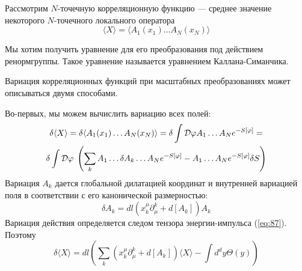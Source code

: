 \documentclass[a4paper,12pt]{article}
\theoremstyle{definition}
\theoremstyle{definition}
\theoremstyle{definition}
\begin{document}
Рассмотрим $N$-точечную корреляционную функцию --- среднее значение некоторого $N$-точечного локального оператора
\begin{equation}
  \label{eq:81}
  \langle X\rangle =\langle A_1 (x_1)\dots A_N (x_N)\rangle
\end{equation}

Мы хотим получить уравнение для его преобразования под действием ренормгруппы. Такое уравнение называется уравнением Каллана-Симанчика. 

Вариация корреляционных функций при масштабных преобразованиях может описываться двумя способами.

Во-первых, мы можем вычислить вариацию всех полей:
\begin{multline}
  \label{eq:82}
  \delta \langle X\rangle=\delta \langle A_1(x_1)\dots A_N (x_N)\rangle = \delta \int {\cal D}\varphi A_1 \dots A_N e^{-S[\varphi]} = \\
  \delta \int {\cal D} \varphi\; \left( \sum_k A_1 \dots \delta A_k \dots A_N e^{-S[\varphi]} -A_1\dots A_N e^{-S[\varphi]}\delta S\right)
\end{multline}
Вариация $A_k$ дается глобальной дилатацией координат и внутренней вариацией поля в соответствии с его канонической размерностью:
\begin{equation}
  \label{eq:88}
  \delta A_k=dl (x^{\mu}_k\partial^k_{\mu}+d[A_k]) A_k
\end{equation}
Вариация действия определяется следом тензора энергии-импульса (\ref{eq:87}). Поэтому
\begin{equation}
  \label{eq:89}
  \delta\langle X\rangle=dl \left(\sum_k (x_k^{\mu}\partial_{\mu}^k+d[A_k])\langle X\rangle-\int d^d y \Theta(y)\right)
\end{equation}
\end{document}
